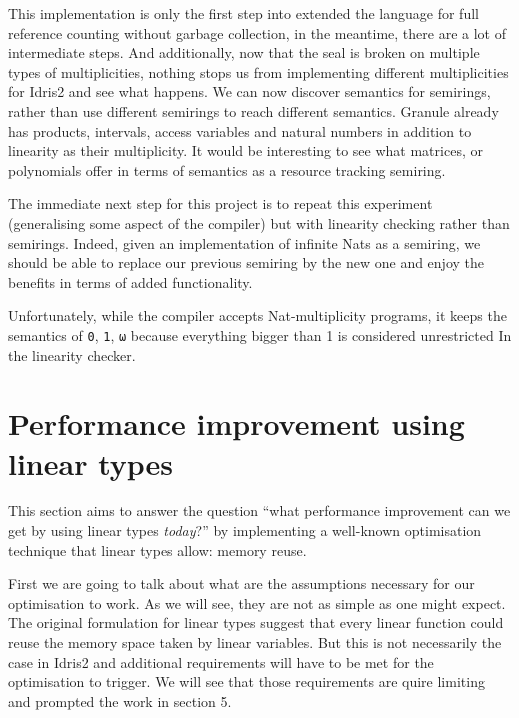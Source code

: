 \documentclass[
]{article}
\begin{document}
This implementation is only the first step into extended the language
for full reference counting without garbage collection, in the meantime,
there are a lot of intermediate steps. And additionally, now that the
seal is broken on multiple types of multiplicities, nothing stops us
from implementing different multiplicities for Idris2 and see what
happens. We can now discover semantics for semirings, rather than use
different semirings to reach different semantics. Granule already has
products, intervals, access variables and natural numbers in addition to
linearity as their multiplicity. It would be interesting to see what
matrices, or polynomials offer in terms of semantics as a resource
tracking semiring.

The immediate next step for this project is to repeat this experiment
(generalising some aspect of the compiler) but with linearity checking
rather than semirings. Indeed, given an implementation of infinite Nats
as a semiring, we should be able to replace our previous semiring by the
new one and enjoy the benefits in terms of added functionality.

Unfortunately, while the compiler accepts Nat-multiplicity programs, it
keeps the semantics of \texttt{0}, \texttt{1}, \texttt{ω} because
everything bigger than 1 is considered unrestricted In the linearity
checker.

\newpage

\hypertarget{performance-improvement-using-linear-types}{%
\section{Performance improvement using linear
types}\label{performance-improvement-using-linear-types}}

This section aims to answer the question ``what performance improvement
can we get by using linear types \emph{today}?'' by implementing a
well-known optimisation technique that linear types allow: memory reuse.

First we are going to talk about what are the assumptions necessary for
our optimisation to work. As we will see, they are not as simple as one
might expect. The original formulation for linear types suggest that
every linear function could reuse the memory space taken by linear
variables. But this is not necessarily the case in Idris2 and additional
requirements will have to be met for the optimisation to trigger. We
will see that those requirements are quire limiting and prompted the
work in section 5.
\end{document}
